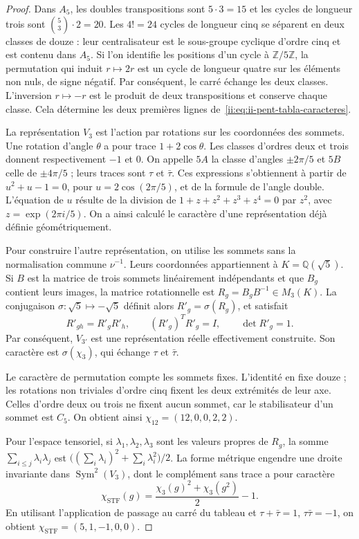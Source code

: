 \begin{proof}
Dans \(A_5\), les doubles transpositions sont \(5\cdot3=15\) et
les cycles de longueur trois sont \(\binom53\cdot2=20\).
Les \(4!=24\) cycles de longueur cinq se séparent en deux classes de
douze : leur centralisateur est le sous-groupe cyclique d’ordre cinq et est
contenu dans \(A_5\). Si l’on identifie les positions d’un cycle
à \(\mathbb Z/5\mathbb Z\), la permutation qui induit
\(r\mapsto2r\) est un cycle de longueur quatre sur les éléments
non nuls, de signe négatif. Par conséquent, le carré échange les deux
classes. L’inversion \(r\mapsto-r\) est le produit de deux
transpositions et conserve chaque classe. Cela détermine les deux premières
lignes de~\eqref{ii:eq:ii-pent-tabla-caracteres}.

La représentation \(V_3\) est l’action par rotations sur les
coordonnées des sommets. Une rotation d’angle \(\theta\)
a pour trace \(1+2\cos\theta\). Les classes d’ordres deux et trois
donnent respectivement \(-1\) et \(0\). On appelle \(5A\) la
classe d’angles \(\pm2\pi/5\) et \(5B\) celle de
\(\pm4\pi/5\) ; leurs traces sont \(\tau\) et \(\bar\tau\).
Ces expressions s’obtiennent à partir de
\(u^2+u-1=0\), pour \(u=2\cos(2\pi/5)\), et de la formule
de l’angle double. L’équation de \(u\) résulte de la division de
\(1+z+z^2+z^3+z^4=0\) par \(z^2\), avec
\(z=\exp(2\pi i/5)\). On a ainsi calculé le caractère d’une
représentation déjà définie géométriquement.

Pour construire l’autre représentation, on utilise les sommets sans la
normalisation commune \(\nu^{-1}\). Leurs coordonnées appartiennent à
\(K=\mathbb Q(\sqrt5)\). Si \(B\) est la matrice de trois sommets
linéairement indépendants et que \(B_g\) contient leurs images, la
matrice rotationnelle est \(R_g=B_gB^{-1}\in M_3(K)\).
La conjugaison \(\sigma:\sqrt5\mapsto-\sqrt5\) définit alors
\(R'_g=\sigma(R_g)\), et satisfait
\[
 R'_{gh}=R'_gR'_h,\qquad
 (R'_g)^TR'_g=I,\qquad \det R'_g=1.
\]
Par conséquent, \(V_{3'}\) est une représentation réelle effectivement
construite. Son caractère est \(\sigma(\chi_3)\), qui échange
\(\tau\) et \(\bar\tau\).

Le caractère de permutation compte les sommets fixes. L’identité en fixe
douze ; les rotations non triviales d’ordre cinq fixent les deux extrémités
de leur axe. Celles d’ordre deux ou trois ne fixent aucun sommet, car le
stabilisateur d’un sommet est \(C_5\). On obtient ainsi
\(\chi_{12}=(12,0,0,2,2)\).

Pour l’espace tensoriel, si \(\lambda_1,\lambda_2,\lambda_3\)
sont les valeurs propres de \(R_g\), la somme
\(\sum_{i\leq j}\lambda_i\lambda_j\) est
\(\bigl((\sum_i\lambda_i)^2+\sum_i\lambda_i^2\bigr)/2\).
La forme métrique engendre une droite invariante dans
\(\operatorname{Sym}^2(V_3)\), dont le complément sans trace a
pour caractère
\begin{equation}
\label{ii:eq:ii-pent-caracter-stf}
 \chi_{\mathrm{STF}}(g)
 =\frac{\chi_3(g)^2+\chi_3(g^2)}2-1.
\end{equation}
En utilisant l’application de passage au carré du tableau et
\(\tau+\bar\tau=1\), \(\tau\bar\tau=-1\), on obtient
\(\chi_{\mathrm{STF}}=(5,1,-1,0,0)\).


\end{proof}
